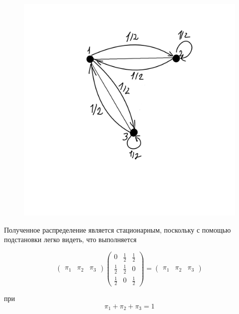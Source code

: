 \documentclass[a4paper,12pt]{article} %
\begin{document}
\begin{figure}[h!]
	\centering
	\includegraphics[width=0.7\linewidth]{screenshot002}
	\label{fig:screenshot001}
\end{figure}




Полученное распределение является стационарным, поскольку с помощью подстановки легко видеть, что выполняется  

$$\left(\begin{array}{lll}
\pi_{1} & \pi_{2} & \pi_{3}
\end{array}\right)\left(\begin{array}{lll}
0 & \frac{1}{2} & \frac{1}{2} \\
\frac{1}{2} & \frac{1}{2} & 0 \\
\frac{1}{2} & 0 & \frac{1}{2}
\end{array}\right) =\left(\begin{array}{lll}
\pi_{1} & \pi_{2} & \pi_{3}
\end{array}\right)  $$

при  $$\pi_{1}+\pi_{2}+\pi_{3}=1 $$  
\end{document}
